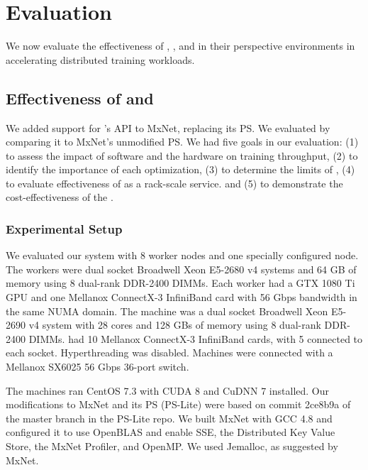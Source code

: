 \chapter {Evaluation}
We now evaluate the effectiveness of \pbox, \phub, \plink and \cmpi in their perspective environments in accelerating distributed training workloads.

\section{Effectiveness of \phub and \pbox}
We added support for \phub{}'s API to MxNet, replacing its PS. We evaluated \phub by comparing it to MxNet's unmodified PS. We had five goals in our evaluation: (1) to assess the impact of \phub software and the \pbox hardware on training throughput, (2) to identify the importance of each optimization, (3) to determine the limits of \pbox, (4) to evaluate effectiveness of \pbox as a rack-scale service. and (5) to demonstrate the cost-effectiveness of the \phub.


\subsection{Experimental Setup}
We evaluated our system with 8 worker nodes and one specially configured \pbox node. The workers were dual socket Broadwell Xeon E5-2680 v4 systems 
and 64 GB of memory using 8 dual-rank DDR-2400 DIMMs. Each worker had a GTX 1080 Ti GPU %
and one Mellanox ConnectX-3 InfiniBand card with 56 Gbps bandwidth in the same NUMA domain. The \pbox machine was a dual socket Broadwell Xeon E5-2690 v4 system with 28 cores %
and 128 GBs of memory using 8 dual-rank DDR-2400 DIMMs. \pbox had 10 Mellanox ConnectX-3 InfiniBand cards, with 5 connected to each socket. Hyperthreading was disabled. Machines were connected with a Mellanox SX6025 56 Gbps 36-port switch.

The machines ran CentOS 7.3 with CUDA 8 and CuDNN 7 installed. Our modifications to MxNet and its PS (PS-Lite) were based on commit 2ce8b9a of the master branch in the PS-Lite repo. We built MxNet with GCC 4.8 and configured it to use OpenBLAS and enable SSE, the Distributed Key Value Store, the MxNet Profiler, and OpenMP. We used Jemalloc, as suggested by MxNet.

